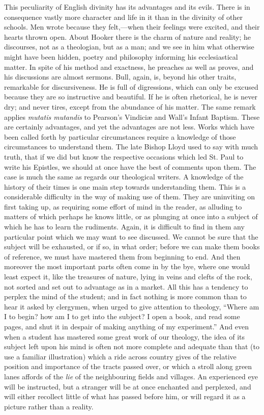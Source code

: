 This peculiarity of English divinity has its
advantages and its evils. There is in consequence vastly more
character and life in it than in the divinity of other schools. Men
wrote because they felt,—when their feelings were excited, and their
hearts thrown open. About Hooker there is the charm of nature and
reality; he discourses, not as a theologian, but as a man; and we see
in him what otherwise might have been hidden, poetry and philosophy
informing his ecclesiastical matter. In spite of his method and
exactness, he preaches as well as proves, and his discussions are
almost sermons. Bull, again, is, beyond his other traits, remarkable
for discursiveness. He is full of digressions, which can only be
excused because they are so instructive and beautiful. If he is often
rhetorical, he is never dry; and never tires, except from the
abundance of his matter. The same remark applies \emph{mutatis mutandis}
to Pearson's Vindiciæ and Wall's Infant Baptism. These are certainly
advantages, and yet the advantages are not less. Works which
have been called forth by particular circumstances require a knowledge
of those circumstances to understand them. The late Bishop Lloyd used
to say with much truth, that if we did but know the respective
occasions which led St. Paul to write his Epistles, we should at once
have the best of comments upon them. The case is much the same as
regards our theological writers. A knowledge of the history of their
times is one main step towards understanding them. This is a
considerable difficulty in the way of making use of them. They are
uninviting on first taking up, as requiring some effort of mind in the
reader, as alluding to matters of which perhaps he knows little, or as
plunging at once into a subject of which he has to learn the
rudiments. Again, it is difficult to find in them any particular point
which we may want to see discussed. We cannot be sure that the subject
will be exhausted, or if so, in what order; before we can make them
books of reference, we must have mastered them from beginning to end.
And then moreover the most important parts often come in by the bye,
where one would least expect it, like the treasures of nature, lying
in veins and clefts of the rock, not sorted and set out to advantage
as in a market. All this has a tendency to perplex the mind of the
student; and in fact nothing is more common than to hear it asked by
clergymen, when urged to give attention to theology, ``Where am I to
begin? how am I to get into the subject? I open a book, and read some
pages, and shut it in despair of making anything of my experiment.''
And even when a student has mastered some great work of our theology,
the idea of its subject left upon his mind is often not more complete
and adequate than that (to use a familiar illustration) which a ride
across country gives of the relative position and importance of
the tracts passed over, or which a stroll along green lanes affords of
the \emph{lie} of the neighbouring fields and villages. An experienced eye
will be instructed, but a stranger will be at once enchanted and
perplexed, and will either recollect little of what has passed before
him, or will regard it as a picture rather than a reality.

